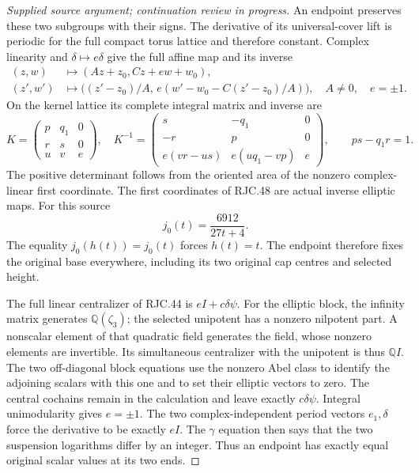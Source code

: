 \begin{proof}[Supplied source argument; continuation review in progress]
An endpoint preserves these two subgroups with their signs.
The derivative of its universal-cover lift is periodic for
the full compact torus lattice and therefore constant.
Complex linearity and \(\delta\mapsto e\delta\) give the
full affine map and its inverse
\[
 \begin{split}
 (z,w)&\longmapsto(Az+z_0,Cz+e w+w_0),\\
 (z',w')&\longmapsto
 \bigl((z'-z_0)/A,\,
 e(w'-w_0-C(z'-z_0)/A)\bigr),
 \quad A\ne0,\quad e=\pm1.
 \end{split}
 \tag{RJC.48}
\]
On the kernel lattice its complete integral matrix and inverse
are
\[
 K=\begin{pmatrix}p&q_1&0\\r&s&0\\u&v&e\end{pmatrix},
 \quad
 K^{-1}=
 \begin{pmatrix}
 s&-q_1&0\\-r&p&0\\e(vr-us)&e(uq_1-vp)&e
 \end{pmatrix},\qquad ps-q_1r=1.
 \tag{RJC.49}
\]
The positive determinant follows from the oriented area of
the nonzero complex-linear first coordinate. The first
coordinates of RJC.48 are actual inverse elliptic maps.
For this source
\[
 j_0(t)=\frac{6912}{27t+4}.
 \tag{RJC.50}
\]
The equality \(j_0(h(t))=j_0(t)\) forces \(h(t)=t\).
The endpoint therefore fixes the original base everywhere,
including its two original cap centres and selected height.

The full linear centralizer of RJC.44 is \(eI+c\delta\psi\).
For the elliptic block, the infinity matrix generates
\(\mathbb Q(\zeta_3)\); the selected unipotent has a nonzero
nilpotent part. A nonscalar element of that quadratic field
generates the field, whose nonzero elements are invertible.
Its simultaneous centralizer with the unipotent is thus
\(\mathbb QI\). The two off-diagonal block equations use
the nonzero Abel class to identify the adjoining scalars
with this one and to set their elliptic vectors to zero.
The central cochains remain in the calculation and leave
exactly \(c\delta\psi\). Integral unimodularity gives
\(e=\pm1\).
The two complex-independent period vectors \(e_1,\delta\)
force the derivative to be exactly \(eI\). The \(\gamma\)
equation then says that the two suspension logarithms
differ by an integer. Thus an endpoint has exactly equal
original scalar values at its two ends.

\par


\end{proof}
